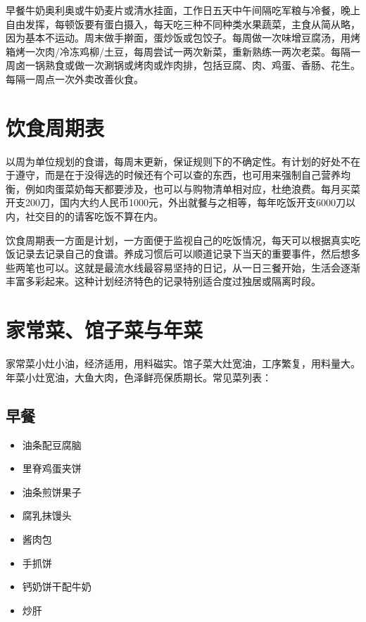 \documentclass[
  letterpaper,
  DIV=11,
  numbers=noendperiod]{scrreprt}
\providecommand{\tightlist}{%
  \setlength{\itemsep}{0pt}\setlength{\parskip}{0pt}}\usepackage{longtable,booktabs,array}
\begin{document}
早餐牛奶奥利奥或牛奶麦片或清水挂面，工作日五天中午间隔吃军粮与冷餐，晚上自由发挥，每顿饭要有蛋白摄入，每天吃三种不同种类水果蔬菜，主食从简从略，因为基本不运动。周末做手擀面，蛋炒饭或包饺子。每周做一次味增豆腐汤，用烤箱烤一次肉/冷冻鸡柳/土豆，每周尝试一两次新菜，重新熟练一两次老菜。每隔一周卤一锅熟食或做一次涮锅或烤肉或炸肉排，包括豆腐、肉、鸡蛋、香肠、花生。每隔一周点一次外卖改善伙食。

\section{饮食周期表}\label{ux996eux98dfux5468ux671fux8868}

以周为单位规划的食谱，每周末更新，保证规则下的不确定性。有计划的好处不在于遵守，而是在于没得选的时候还有个可以查的东西，也可用来强制自己营养均衡，例如肉蛋菜奶每天都要涉及，也可以与购物清单相对应，杜绝浪费。每月买菜开支200刀，国内大约人民币1000元，外出就餐与之相等，每年吃饭开支6000刀以内，社交目的的请客吃饭不算在内。

饮食周期表一方面是计划，一方面便于监视自己的吃饭情况，每天可以根据真实吃饭记录去记录自己的食谱。养成习惯后可以顺道记录下当天的重要事件，然后想多些两笔也可以。这就是最流水线最容易坚持的日记，从一日三餐开始，生活会逐渐丰富多彩起来。这种计划经济特色的记录特别适合度过独居或隔离时段。

\section{家常菜、馆子菜与年菜}\label{ux5bb6ux5e38ux83dcux9986ux5b50ux83dcux4e0eux5e74ux83dc}

家常菜小灶小油，经济适用，用料磁实。馆子菜大灶宽油，工序繁复，用料量大。年菜小灶宽油，大鱼大肉，色泽鲜亮保质期长。常见菜列表：

\subsection{早餐}\label{ux65e9ux9910}

\begin{itemize}
\tightlist
\item
  油条配豆腐脑
\item
  里脊鸡蛋夹饼
\item
  油条煎饼果子
\item
  腐乳抹馒头
\item
  酱肉包
\item
  手抓饼
\item
  钙奶饼干配牛奶
\item
  炒肝
\end{itemize}
\end{document}

